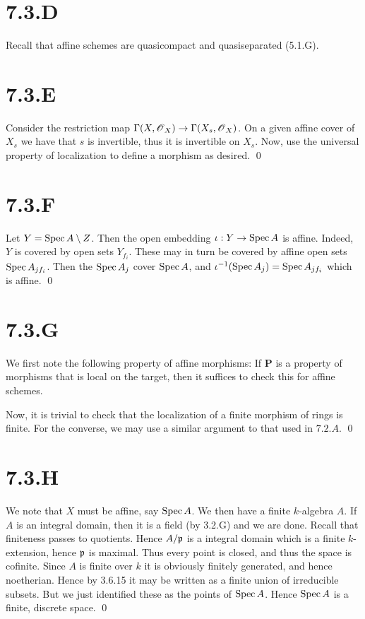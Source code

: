 \documentclass{article}
\begin{document}
\section{7.3.D}
Recall that affine schemes are quasicompact and quasiseparated (5.1.G).

\section{7.3.E}
Consider the restriction map $\Gamma(X, \operatorname{\mathscr{O}}_X) \to \Gamma(X_s, \operatorname{\mathscr{O}}_X)$. On a given affine cover
of $X_s$ we have that $s$ is invertible,
thus it is invertible on $X_s$. Now, use the universal
property of localization to define a morphism as desired. \qed

\section{7.3.F}
Let $Y=\operatorname{Spec} A \setminus Z$. Then the open embedding $\iota: Y \to \operatorname{Spec} A$ is
affine. Indeed, $Y$ is covered by open sets
$Y_{f_i}$. These may in turn be covered by affine open sets
$\operatorname{Spec} A_{jf_i}$. Then the $\operatorname{Spec} A_j$ cover
$\operatorname{Spec}
    A$, and $\iota^{-1}(\operatorname{Spec} A_j)=\operatorname{Spec} A_{jf_i}$ which is affine. \qed

\section{7.3.G}
We first note the following property of affine morphisms: If
$\mathbf{P}$ is a property of morphisms that is local on the target,
then it suffices to check this for affine schemes.

Now, it is trivial to check that the localization of a finite morphism of rings
is finite. For the converse, we may use a similar argument to that used in
$7.2.A$. \qed

\section{7.3.H}
We note that $X$ must be affine, say
$\operatorname{Spec} A$. We then have a finite $k$-algebra
$A$. If $A$ is an integral domain, then
it is a field (by 3.2.G) and we are done. Recall that finiteness passes to
quotients. Hence $A/\mathfrak{p}$ is a integral domain which is a finite
$k$-extension, hence $\mathfrak{p}$ is maximal.
Thus every point is closed, and thus the space is cofinite. Since
$A$ is finite over $k$ it is obviously
finitely generated, and hence noetherian. Hence by 3.6.15 it may be written as
a finite union of irreducible subsets. But we just identified these as the
points of $\operatorname{Spec} A$. Hence $\operatorname{Spec} A$ is a finite,
discrete space. \qed
\end{document}
